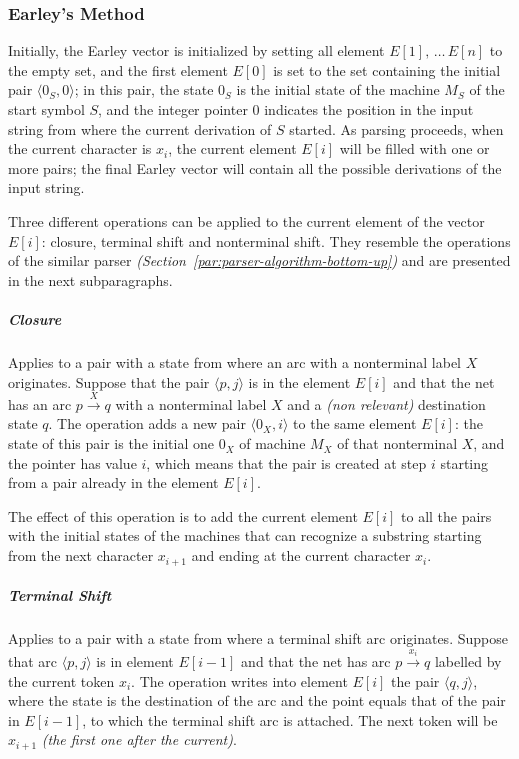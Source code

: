 \documentclass[english]{article}
\begin{document}
\subsubsection{Earley's Method}

Initially, the Earley vector is initialized by setting all element \(E[1], \, \ldots \, E[n]\) to the empty set, and the first element \(E[0]\) is set to the set containing the initial pair \(\langle 0_S, 0 \rangle\);
in this pair, the state \(0_S\) is the initial state of the machine \(M_S\) of the start symbol \(S\), and the integer pointer \(0\) indicates the position in the input string from where the current derivation of \(S\) started.
As parsing proceeds, when the current character is \(x_i\), the current element \(E[i]\) will be filled with one or more pairs;
the final Earley vector will contain all the possible derivations of the input string.

Three different operations can be applied to the current element of the vector \(E[i]\):
closure, terminal shift and nonterminal shift.
They resemble the operations of the similar \elro parser \textit{(Section~\ref{par:parser-algorithm-bottom-up})} and are presented in the next subparagraphs.

\subparagraph*{Closure}
Applies to a pair with a state from where an arc with a nonterminal label \(X\) originates.
Suppose that the pair \(\langle p, j \rangle\) is in the element \(E[i]\) and that the net has an arc \(p \xrightarrow{X} q\) with a nonterminal label \(X\) and a \textit{(non relevant)} destination state \(q\).
The operation adds a new pair \(\langle 0_X, i \rangle\) to the same element \(E[i]\):
the state of this pair is the initial one \(0_X\) of machine \(M_X\) of that nonterminal \(X\), and the pointer has value \(i\), which means that the pair is created at step \(i\) starting from a pair already in the element \(E[i]\).

The effect of this operation is to add the current element \(E[i]\) to all the pairs with the initial states of the machines that can recognize a substring starting from the next character \(x_{i+1}\) and ending at the current character \(x_i\).

\subparagraph*{Terminal Shift}
Applies to a pair with a state from where a terminal shift arc originates.
Suppose that arc \(\langle p, j \rangle\) is in element \(E[i-1]\) and that the net has arc \(p \xrightarrow{x_i} q\) labelled by the current token \(x_i\).
The operation writes into element \(E[i]\) the pair \(\langle q, j \rangle\), where the state is the destination of the arc and the point equals that of the pair in \(E[i-1]\), to which the terminal shift arc is attached.
The next token will be \(x_{i+1}\) \textit{(the first one after the current)}.
\end{document}
